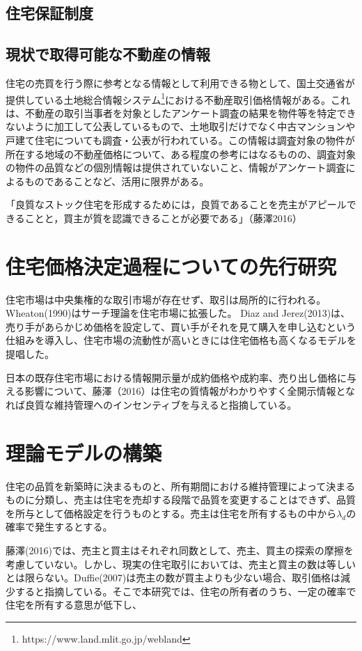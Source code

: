 \documentclass[a4paper,11pt]{jlreq}
\begin{document}
\subsection{住宅保証制度}

\subsection{現状で取得可能な不動産の情報}
住宅の売買を行う際に参考となる情報として利用できる物として、国土交通省が提供している土地総合情報システム\footnote{https://www.land.mlit.go.jp/webland}における不動産取引価格情報がある。これは、不動産の取引当事者を対象としたアンケート調査の結果を物件等を特定できないように加工して公表しているもので、土地取引だけでなく中古マンションや戸建て住宅についても調査・公表が行われている。この情報は調査対象の物件が所在する地域の不動産価格について、ある程度の参考にはなるものの、調査対象の物件の品質などの個別情報は提供されていないこと、情報がアンケート調査によるものであることなど、活用に限界がある。

「良質なストック住宅を形成するためには，良質であることを売主がアピールできることと，買主が質を認識できることが必要である」（藤澤2016）%


\section{住宅価格決定過程についての先行研究}
住宅市場は中央集権的な取引市場が存在せず、取引は局所的に行われる。
Wheaton(1990)はサーチ理論を住宅市場に拡張した。
Diaz and Jerez(2013)は、売り手があらかじめ価格を設定して、買い手がそれを見て購入を申し込むという仕組みを導入し、住宅市場の流動性が高いときには住宅価格も高くなるモデルを提唱した。

日本の既存住宅市場における情報開示量が成約価格や成約率、売り出し価格に与える影響について、藤澤（2016）は住宅の質情報がわかりやすく全開示情報となれば良質な維持管理へのインセンティブを与えると指摘している。
\section{理論モデルの構築}
住宅の品質を新築時に決まるものと、所有期間における維持管理によって決まるものに分類し、売主は住宅を売却する段階で品質を変更することはできず、品質を所与として価格設定を行うものとする。売主は住宅を所有するもの中から$\lambda_{d}$の確率で発生するとする。

藤澤(2016)では、売主と買主はそれぞれ同数として、売主、買主の探索の摩擦を考慮していない。しかし、現実の住宅取引においては、売主と買主の数は等しいとは限らない。Duffie(2007)は売主の数が買主よりも少ない場合、取引価格は減少すると指摘している。そこで本研究では、住宅の所有者のうち、一定の確率で住宅を所有する意思が低下し、
\end{document}
